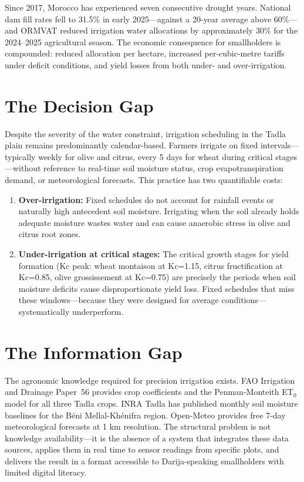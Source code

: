 \documentclass[12pt,a4paper]{report}
\begin{document}
Since 2017, Morocco has experienced seven consecutive drought years. National dam fill rates fell to 31.5\% in early 2025---against a 20-year average above 60\%---and ORMVAT reduced irrigation water allocations by approximately 30\% for the 2024--2025 agricultural season. The economic consequence for smallholders is compounded: reduced allocation per hectare, increased per-cubic-metre tariffs under deficit conditions, and yield losses from both under- and over-irrigation.

\section{The Decision Gap}

Despite the severity of the water constraint, irrigation scheduling in the Tadla plain remains predominantly calendar-based. Farmers irrigate on fixed intervals---typically weekly for olive and citrus, every 5 days for wheat during critical stages---without reference to real-time soil moisture status, crop evapotranspiration demand, or meteorological forecasts. This practice has two quantifiable costs:

\begin{enumerate}
  \item \textbf{Over-irrigation:} Fixed schedules do not account for rainfall events or naturally high antecedent soil moisture. Irrigating when the soil already holds adequate moisture wastes water and can cause anaerobic stress in olive and citrus root zones.
  \item \textbf{Under-irrigation at critical stages:} The critical growth stages for yield formation (Kc peak: wheat montaison at Kc=1.15, citrus fructification at Kc=0.85, olive grossissement at Kc=0.75) are precisely the periods when soil moisture deficits cause disproportionate yield loss. Fixed schedules that miss these windows---because they were designed for average conditions---systematically underperform.
\end{enumerate}

\section{The Information Gap}

The agronomic knowledge required for precision irrigation exists. FAO Irrigation and Drainage Paper~56 provides crop coefficients and the Penman-Monteith ET$_0$ model for all three Tadla crops. INRA Tadla has published monthly soil moisture baselines for the Béni Mellal-Khénifra region. Open-Meteo provides free 7-day meteorological forecasts at 1 km resolution. The structural problem is not knowledge availability---it is the absence of a system that integrates these data sources, applies them in real time to sensor readings from specific plots, and delivers the result in a format accessible to Darija-speaking smallholders with limited digital literacy.
\end{document}
